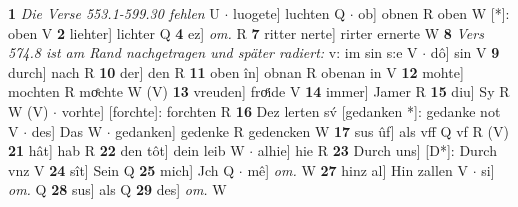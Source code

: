 \documentclass[8pt,a4paper,notitlepage]{article}
\begin{document}
\begin{table}[ht]
\begin{minipage}[t]{0.5\linewidth}
\textbf{1} \textit{Die Verse 553.1-599.30 fehlen} U   $\cdot$ luogete] luchten Q  $\cdot$ ob] obnen R oben W [*]: oben V \textbf{2} liehter] lichter Q \textbf{4} ez] \textit{om.} R \textbf{7} ritter nerte] rirter ernerte W \textbf{8} \textit{Vers 574.8 ist am Rand nachgetragen und später radiert:} v: im sin s:e V   $\cdot$ dô] sin V \textbf{9} durch] nach R \textbf{10} der] den R \textbf{11} oben în] obnan R obenan in V \textbf{12} mohte] mochten R moͤchte W (V) \textbf{13} vreuden] froͤide V \textbf{14} immer] Jamer R \textbf{15} diu] Sy R W (V)  $\cdot$ vorhte] [forchte]: forchten R \textbf{16} Dez lerten sv́ [gedanken *]: gedanke not V  $\cdot$ des] Das W  $\cdot$ gedanken] gedenke R gedencken W \textbf{17} sus ûf] als vff Q vf R (V) \textbf{21} hât] hab R \textbf{22} den tôt] dein leib W  $\cdot$ alhie] hie R \textbf{23} Durch uns] [D*]: Durch vnz V \textbf{24} sît] Sein Q \textbf{25} mich] Jch Q  $\cdot$ mê] \textit{om.} W \textbf{27} hinz al] Hin zallen V  $\cdot$ si] \textit{om.} Q \textbf{28} sus] als Q \textbf{29} des] \textit{om.} W \newline
\end{minipage}
\end{table}
\end{document}
